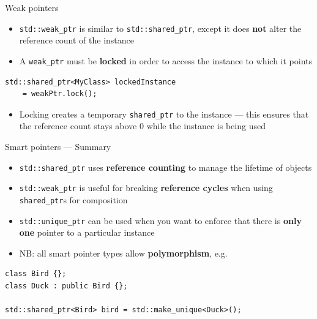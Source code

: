 \begin{frame}[fragile]{Weak pointers}
    \begin{itemize}
        \item \lstinline{std::weak_ptr} is similar to \lstinline{std::shared_ptr},
            except it does \textbf{not} alter the reference count of the instance \pause
        \item A \lstinline{weak_ptr} must be \textbf{locked} in order to access the instance to which
            it points \pause
    \end{itemize}
    \begin{lstlisting}
std::shared_ptr<MyClass> lockedInstance
    = weakPtr.lock();
    \end{lstlisting} \pause
    \begin{itemize}
        \item Locking creates a temporary \lstinline{shared_ptr} to the instance ---
            this ensures that the reference count stays above 0 while the instance is being used
    \end{itemize}
\end{frame}

\begin{frame}[fragile]{Smart pointers --- Summary}
    \begin{itemize}
        \item \lstinline{std::shared_ptr} uses \textbf{reference counting} to manage the lifetime
            of objects \pause
        \item \lstinline{std::weak_ptr} is useful for breaking \textbf{reference cycles}
            when using \lstinline{shared_ptr}s for composition \pause
        \item \lstinline{std::unique_ptr} can be used when you want to enforce that there is
            \textbf{only one} pointer to a particular instance \pause
        \item NB: all smart pointer types allow \textbf{polymorphism}, e.g.
    \end{itemize}
    \begin{lstlisting}
class Bird {};
class Duck : public Bird {};

std::shared_ptr<Bird> bird = std::make_unique<Duck>();
    \end{lstlisting}
\end{frame}

